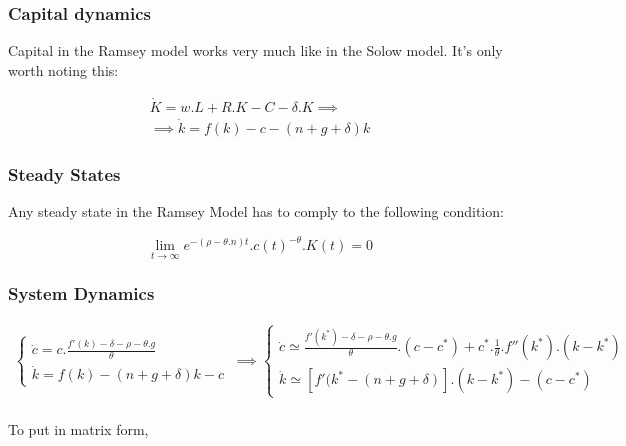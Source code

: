 \subsubsection{Capital dynamics}
Capital in the Ramsey model works very much like in the Solow model. It's only worth noting this: 

\begin{equation*}
\begin{aligned}
    \dot{K}=w.L+R.K-C-\delta . K \implies \\
    \implies \dot{k}=f(k)-c-(n+g+\delta)k
\end{aligned}
\end{equation*}

\subsubsection{Steady States}
Any steady state in the Ramsey Model has to comply to the following condition:

\begin{equation*}
    \lim_{t\rightarrow \infty}e^{-(\rho - \theta .n)t}.c(t)^{-\theta}.K(t)=0
\end{equation*}

\subsubsection{System Dynamics}



\begin{equation*}
\begin{aligned}
    \begin{cases} \dot{c}=c.\frac{f'(k)-\delta-\rho-\theta .g}{\theta} \\ 
    \dot{k}=f(k)-(n+g+\delta )k-c
    \end{cases}
\ \implies
\begin{cases}
     \dot{c} \simeq    \frac{f'(k^{*})-\delta-\rho-\theta . g}{\theta}.(c-c^{*})+c^{*}.\frac{1}{\theta}.f''(k^{*}).(k-k^{*}) \\
     \dot{k} \simeq [f'(k^{*}-(n+g+\delta)].(k-k^{*})-(c-c^{*})
\end{cases}
\end{aligned}
\end{equation*}

\paragraph{}
To put in matrix form,

